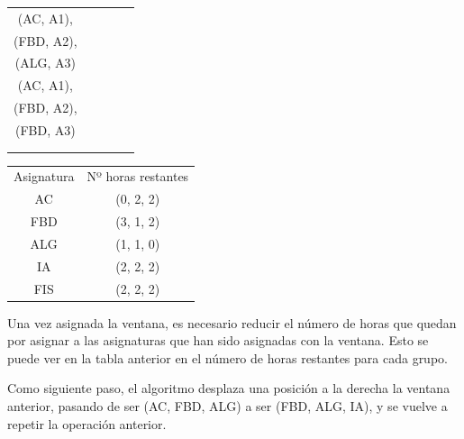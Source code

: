 \begin{minipage}{0.5\textwidth}    
\begin{tabular}{| c | c | c | c | c |}
\hline
 (AC, A1), &  &  &  & \\
 (FBD, A2), &  &  &  & \\
 (ALG, A3) &  &  &  & \\
 \hline
 (AC, A1), &  &  &  & \\
 (FBD, A2), &  &  &  & \\
 (FBD, A3) &  &  &  & \\
 \hline
 &  &  &  & \\
 \hline
 &  &  &  & \\
 \hline 
\end{tabular}
\end{minipage}
\begin{minipage}{0.5\textwidth}
\begin{tabular}{c | c}
Asignatura & Nº horas restantes \\
AC & (0, 2, 2) \\
FBD & (3, 1, 2) \\
ALG & (1, 1, 0) \\
IA & (2, 2, 2) \\
FIS & (2, 2, 2)
\end{tabular}
\end{minipage}

Una vez asignada la ventana, es necesario reducir el número de horas que quedan por asignar a las asignaturas que han sido asignadas con la ventana. Esto se puede ver en la tabla anterior en el número de horas restantes para cada grupo.

Como siguiente paso, el algoritmo desplaza una posición a la derecha la ventana anterior, pasando de ser (AC, FBD, ALG) a ser (FBD, ALG, IA), y se vuelve a repetir la operación anterior.

